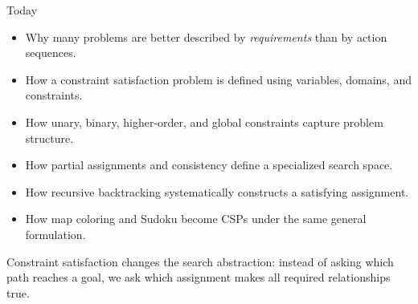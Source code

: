 \documentclass[aspectratio=169,10pt]{beamer}
\begin{document}
\makedecktitle

\begin{frame}[shrink=20]{Today}
  \begin{itemize}
    \item Why many problems are better described by \emph{requirements} than by action sequences.
    \item How a constraint satisfaction problem is defined using variables, domains, and constraints.
    \item How unary, binary, higher-order, and global constraints capture problem structure.
    \item How partial assignments and consistency define a specialized search space.
    \item How recursive backtracking systematically constructs a satisfying assignment.
    \item How map coloring and Sudoku become CSPs under the same general formulation.
  \end{itemize}

  \begin{keyidea}
    Constraint satisfaction changes the search abstraction: instead of asking which path reaches a goal, we ask which assignment makes all required relationships true.
  \end{keyidea}
\end{frame}

\end{document}
